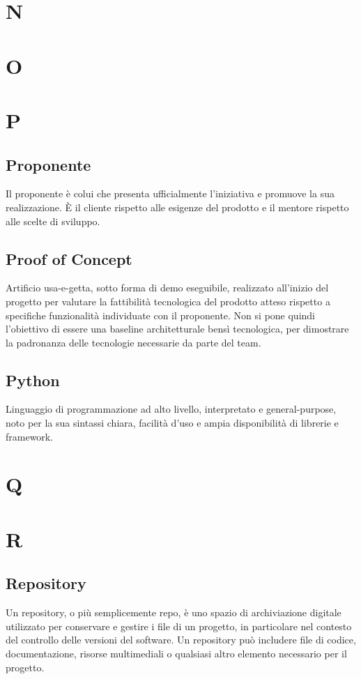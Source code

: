 \documentclass[8pt]{article}
\begin{document}
	\section*{N}
	\section*{O}
	\section*{P}
	\subsection*{Proponente}
	Il proponente è colui che presenta ufficialmente l'iniziativa e promuove la sua realizzazione. È il cliente rispetto alle esigenze del prodotto e il mentore rispetto alle scelte di sviluppo.
	\subsection*{Proof of Concept}
	Artificio usa-e-getta, sotto forma di demo eseguibile, realizzato all'inizio del progetto per valutare la fattibilità tecnologica del prodotto atteso rispetto a specifiche funzionalità individuate con il proponente. Non si pone quindi l'obiettivo di essere una baseline architetturale bensì tecnologica, per dimostrare la padronanza delle tecnologie necessarie da parte del team.
	\newpage
	\subsection*{Python}
	Linguaggio di programmazione ad alto livello, interpretato e general-purpose, noto per la sua sintassi chiara, facilità d'uso e ampia disponibilità di librerie e framework.
	\newpage
	\section*{Q}
	\section*{R}
	\subsection*{Repository}
	Un repository, o più semplicemente repo, è uno spazio di archiviazione digitale utilizzato per conservare e gestire i file di un progetto, in particolare nel contesto del controllo delle versioni del software. Un repository può includere file di codice, documentazione, risorse multimediali o qualsiasi altro elemento necessario per il progetto.
\end{document}
